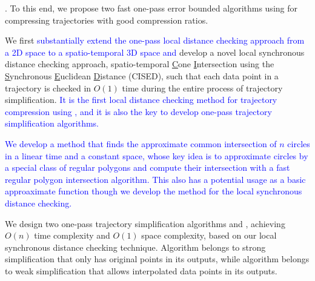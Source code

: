 . To this end, we propose two fast one-pass error bounded \lsa algorithms using \sed for compressing trajectories with good compression ratios. %

 We first \textcolor{blue}{substantially extend the one-pass local distance checking approach from a 2D space to a spatio-temporal 3D space and} develop a novel local synchronous distance checking approach, \ie spatio-temporal \underline{C}one \underline{I}ntersection using the \underline{S}ynchronous \underline{E}uclidean \underline{D}istance (CISED), such that each data point in a trajectory is checked in $O(1)$ time during the entire process of trajectory simplification.
\textcolor{blue}{It is the first local distance checking method for trajectory compression using \sed, and it is also the key to develop one-pass trajectory simplification algorithms.}



 \textcolor{blue}{We develop a method that finds the approximate common intersection of $n$ circles in a linear time and a constant space, whose key idea is to approximate circles by a special class of regular polygons and compute their intersection with a fast regular polygon intersection algorithm. This also has a potential usage as a basic approaximate function though we develop the method for the local synchronous distance checking.}



 We design two one-pass trajectory simplification algorithms \cist and \cista, achieving $O(n)$ time complexity and $O(1)$ space complexity, based on our local synchronous distance checking technique.
Algorithm \cist belongs to strong simplification that only has original points in its outputs, while algorithm \cista belongs to weak simplification that allows interpolated data points in its outputs.


